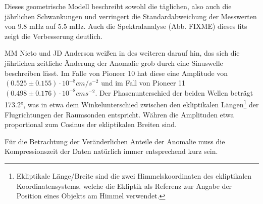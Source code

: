 Dieses geometrische Modell beschreibt sowohl die täglichen, also auch die jährlichen
Schwankungen und verringert die Standardabweichung der Messwerten von 9.8 mHz auf 5.5 mHz.
Auch die Spektralanalyse (Abb. FIXME) dieses fits zeigt die Verbesserung deutlich.\cite{Levy2008} %

MM Nieto und JD Anderson weißen in \cite{Nieto2005} des weiteren darauf hin, das sich die jährlichen zeitliche Änderung der Anomalie %
grob durch eine Sinuswelle beschreiben lässt. Im Falle von Pioneer 10 hat diese eine Amplitude von $(0.525\pm0.155)\cdot10^{-8}cm/s^{-2}$ und im Fall von Pioneer 11 $(0.498\pm0.176)\cdot10^{-8}cms^{-2}$. Der Phasenunterschied der beiden Wellen beträgt 173.2°, was in etwa dem Winkelunterschied zwischen den ekliptikalen Längen\footnote{Ekliptikale Länge/Breite sind die zwei Himmelskoordinaten des ekliptikalen Koordinatensystems, welche die Ekliptik als Referenz zur Angabe der Position eines Objekts am Himmel verwendet.} der Flugrichtungen der Raumsonden entspricht. Währen die Amplituden etwa proportional zum Cosinus der ekliptikalen Breiten sind.

Für die Betrachtung der Veränderlichen Anteile der Anomalie muss die Kompressionszeit der Daten natürlich immer entsprechend kurz sein.\cite{Nieto2005}